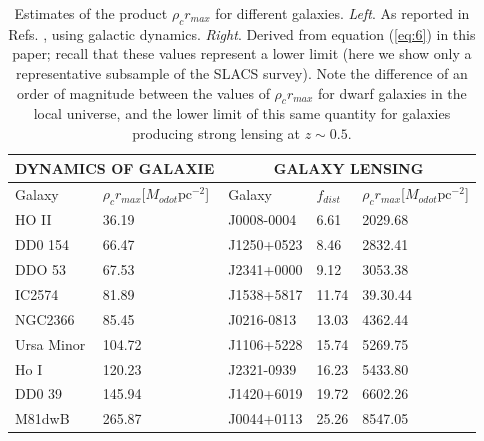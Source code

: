 \documentclass[10pt,letterpaper,twocolumn]{article}
\begin{document}
\begin{table}[t]
  \centering
        \begin{tabular}{ |p{2cm}|p{3cm}|p{2cm}|p{1cm}|p{3cm}|}
         \hline
         \multicolumn{2}{|c|}{\textbf{DYNAMICS OF GALAXIE}} 
         &\multicolumn{3}{|c|}{\textbf{GALAXY LENSING}} \\
         \hline
         Galaxy & $\rho_cr_{max}$[$M_{odot}\text{pc}^{-2}$] & Galaxy & $f_{dist}$ & $\rho_cr_{max}$[$M_{odot}\text{pc}^{-2}$] \\ 
         \hline
         HO II   & 36.19 & J0008-0004 & 6.61 & 2029.68\\
         \hline
         DD0 154 & 66.47 & J1250+0523 & 8.46 & 2832.41\\
          \hline
         DDO 53 & 67.53 & J2341+0000 & 9.12 & 3053.38\\
          \hline
         IC2574 & 81.89 & J1538+5817 & 11.74 & 39.30.44\\
          \hline
         NGC2366 & 85.45 & J0216-0813 & 13.03 & 4362.44\\
          \hline
         Ursa Minor & 104.72 & J1106+5228 & 15.74 & 5269.75\\
          \hline
         Ho I &120.23 & J2321-0939 & 16.23 & 5433.80\\
         \hline
         DD0 39 & 145.94 & J1420+6019 & 19.72 & 6602.26\\
         \hline
         M81dwB & 265.87 & J0044+0113 & 25.26 & 8547.05\\
         \hline
         \end{tabular}
                  \vspace{1em}
         \caption{Estimates of the product $\rho_{c}r_{max}$ for different galaxies. \textit{Left}. As reported in Refs. \cite{7}, using galactic dynamics. \textit{Right}. Derived from equation (\ref{eq:6}) in this paper; recall that these values represent a lower limit (here we show only a representative subsample of the SLACS survey). Note the difference of an order of magnitude between the values of $\rho_{c}r_{max}$ for dwarf galaxies in the local universe, and the lower limit of this same quantity for galaxies producing strong lensing at $z\sim 0.5$.}
        \label{tab:1}
    \end{table}
\end{document}
